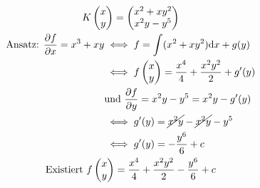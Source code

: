 \begin{bsp*}
	\begin{gather*}
		K\begin{pmatrix} x \\ y \end{pmatrix} = \begin{pmatrix} x^2 + xy^2 \\ x^2y - y^5 \end{pmatrix} \\
		\begin{split}
			\text{Ansatz: } \frac{\partial f}{\partial x} = x^3 + xy
				&\iff f = \int (x^2 + xy^2) \dd x + g(y) \\
				&\iff f\begin{pmatrix} x \\ y \end{pmatrix} = \frac{x^4}{4} + \frac{x^2 y^2}{2} + g'(y) \\
				&\text{und } \frac{\partial f}{\partial y} = x^2 y - y^5 = x^2 y - g'(y) \\
				&\iff g'(y) = \cancel{x^2 y} - \cancel{x^2 y} - y^5 \\
				&\iff g'(y) = -\frac{y^6}{6} + c
		\end{split} \\
		\text{Existiert } f\begin{pmatrix} x \\ y \end{pmatrix} = \frac{x^4}{4} + \frac{x^2 y^2}{2} - \frac{y^6}{6} + c
	\end{gather*}
\end{bsp*}

